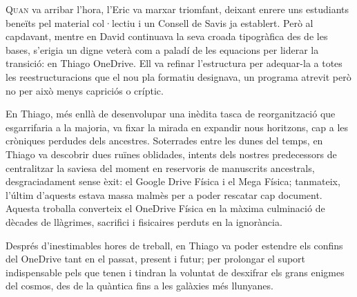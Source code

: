
\lettrine[loversize=0.2, lines=2]{Q}{uan} va arribar l'hora, l'Eric va marxar triomfant, deixant enrere uns estudiants beneïts pel material col·lectiu i un Consell de Savis ja establert. Però al capdavant, mentre en David continuava la seva croada tipogràfica des de les bases, s'erigia un digne veterà com a paladí de les equacions per liderar la transició: en Thiago OneDrive. Ell va refinar l'estructura per adequar-la a totes les reestructuracions que el nou pla formatiu designava, un programa atrevit però no per això menys capriciós o críptic.

En Thiago, més enllà de desenvolupar una inèdita tasca de reorganització que esgarrifaria a la majoria, va fixar la mirada en expandir nous horitzons, cap a les cròniques perdudes dels ancestres. Soterrades entre les dunes del temps, en Thiago va descobrir dues ruïnes oblidades, intents dels nostres predecessors de centralitzar la saviesa del moment en reservoris de manuscrits ancestrals, desgraciadament sense èxit: el Google Drive Física i el Mega Física; tanmateix, l'últim d'aquests estava massa malmès per a poder rescatar cap document. Aquesta troballa converteix el OneDrive Física en la màxima culminació de dècades de llàgrimes, sacrifici i fisicaires perduts en la ignorància.

Després d'inestimables hores de treball, en Thiago va poder estendre els confins del OneDrive tant en el passat, present i futur; per prolongar el suport indispensable pels que tenen i tindran la voluntat de desxifrar els grans enigmes del cosmos, des de la quàntica fins a les galàxies més llunyanes.





















